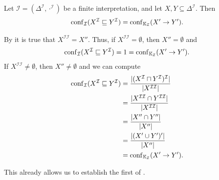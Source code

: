 \begin{Proposition}
  \label{prop:confidence-in-I-is-confidence-in-K_I}
  Let $\mathcal{I} = (\Delta^{\mathcal{I}}, \cdot^{\mathcal{I}})$ be a finite
  interpretation, and let $X, Y \subseteq \Delta^{\mathcal{I}}$.  Then
  \begin{equation*}
    \operatorname{conf}_{\mathcal{I}}(X^{\mathcal{I}} \sqsubseteq Y^{\mathcal{I}}) = \operatorname{conf}_{{\mathbb{K}}_{\mathcal{I}}}(X' \to Y').
  \end{equation*}
\end{Proposition}
\begin{Proof}
  By  it is true that $X^{\mathcal{I}\mathcal{I}} = X''$.
  Thus, if $X^{\mathcal{I}\mathcal{I}} = \emptyset$, then $X'' = \emptyset$ and
  \begin{equation*}
    \operatorname{conf}_{\mathcal{I}}(X^{\mathcal{I}} \sqsubseteq Y^{\mathcal{I}}) = 1 = \operatorname{conf}_{{\mathbb{K}}_{\mathcal{I}}}(X' \to Y').
  \end{equation*}
  If $X^{\mathcal{I}\mathcal{I}} \neq \emptyset$, then $X'' \neq \emptyset$ and we can compute
  \begin{align*}
    \operatorname{conf}_{\mathcal{I}}(X^{\mathcal{I}} \sqsubseteq Y^{\mathcal{I}})
    &= \frac{ \lvert (X^{\mathcal{I}} \sqcap Y^{\mathcal{I}})^{\mathcal{I}} \rvert }{ \lvert
        X^{\mathcal{I}\mathcal{I}} \rvert }\\
    &= \frac{ \lvert X^{\mathcal{I}\mathcal{I}} \cap Y^{\mathcal{I}\mathcal{I}} \rvert }{ \lvert
        X^{\mathcal{I}\mathcal{I}} \rvert } \\
    &= \frac{ \lvert X'' \cap Y'' \rvert }{ \lvert X'' \rvert } \\
    &= \frac{ \lvert (X' \cup Y')' \rvert }{ \lvert X'' \rvert } \\
    &= \operatorname{conf}_{{\mathbb{K}}_{\mathcal{I}}}(X' \to Y').
  \end{align*}
\end{Proof}

This already allows us to establish the first of .

